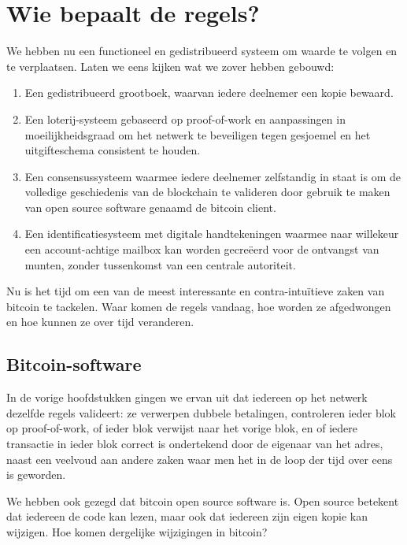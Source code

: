 

\chapter{Wie bepaalt de regels?}

We hebben nu een functioneel en gedistribueerd systeem om waarde te volgen en te verplaatsen. Laten we eens kijken wat we zover hebben gebouwd:

\begin{enumerate}
    \item Een gedistribueerd grootboek, waarvan iedere deelnemer een kopie bewaard.
    \item Een loterij-systeem gebaseerd op proof-of-work en aanpassingen in moeilijkheidsgraad om het netwerk te beveiligen tegen gesjoemel en het uitgifteschema consistent te houden.
    \item Een consensussysteem waarmee iedere deelnemer zelfstandig in staat is om de volledige geschiedenis van de blockchain te valideren door gebruik te maken van open source software genaamd de bitcoin client. 
    \item Een identificatiesysteem met digitale handtekeningen waarmee naar willekeur een account-achtige mailbox kan worden gecreëerd voor de ontvangst van munten, zonder tussenkomst van een centrale autoriteit.
\end{enumerate}

Nu is het tijd om een van de meest interessante en contra-intuïtieve zaken van bitcoin te tackelen. Waar komen de regels vandaag, hoe worden ze afgedwongen en hoe kunnen ze over tijd veranderen. 

\section{Bitcoin-software}

In de vorige hoofdstukken gingen we ervan uit dat iedereen op het netwerk dezelfde regels valideert: ze verwerpen dubbele betalingen, controleren ieder blok op proof-of-work, of ieder blok verwijst naar het vorige blok, en of iedere transactie in ieder blok correct is ondertekend door de eigenaar van het adres, naast een veelvoud aan andere zaken waar men het in de loop der tijd over eens is geworden. 

We hebben ook gezegd dat bitcoin open source software is. Open source betekent dat iedereen de code kan lezen, maar ook dat iedereen zijn eigen kopie kan wijzigen. Hoe komen dergelijke wijzigingen in bitcoin?

